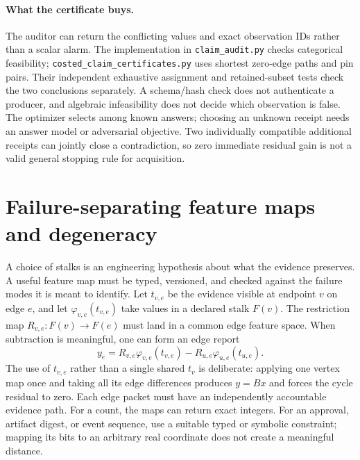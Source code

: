 \documentclass[11pt,a4paper]{article}
\begin{document}
\paragraph{What the certificate buys.}
The auditor can return the conflicting values and exact observation IDs rather
than a scalar alarm. The implementation in \texttt{claim\_audit.py} checks
categorical feasibility; \texttt{costed\_claim\_certificates.py} uses shortest
zero-edge paths and pin pairs. Their independent exhaustive assignment and
retained-subset tests check the two conclusions separately. A schema/hash check
does not authenticate a producer, and algebraic infeasibility does not decide
which observation is false. The optimizer selects among known answers;
choosing an unknown receipt needs an answer model or adversarial objective.
Two individually compatible additional receipts can jointly close a
contradiction, so zero immediate residual gain is not a valid general stopping
rule for acquisition.

\section{Failure-separating feature maps and degeneracy}\label{sec:identifiability}
A choice of stalks is an engineering hypothesis about what the evidence preserves. A useful feature map must be typed, versioned, and checked against the failure modes it is meant to identify. Let $t_{v,e}$ be the evidence visible at endpoint $v$ on edge $e$, and let $\varphi_{v,e}(t_{v,e})$ take values in a declared stalk $F(v)$. The restriction map $R_{v,e}:F(v)\to F(e)$ must land in a common edge feature space. When subtraction is meaningful, one can form an edge report
\[
y_e=R_{v,e}\varphi_{v,e}(t_{v,e})-R_{u,e}\varphi_{u,e}(t_{u,e}).
\]
The use of $t_{v,e}$ rather than a single shared $t_v$ is deliberate: applying one vertex map once and taking all its edge differences produces $y=Bx$ and forces the cycle residual to zero. Each edge packet must have an independently accountable evidence path. For a count, the maps can return exact integers. For an approval, artifact digest, or event sequence, use a suitable typed or symbolic constraint; mapping its bits to an arbitrary real coordinate does not create a meaningful distance.
\end{document}
